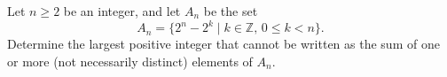 Let 
$n \ge 2$
 be an integer, and let 
$A_n$
 be the set 
\[A_n = \{2^n  - 2^k\mid k \in \mathbb{Z},\, 0 \le k < n\}.\]
 Determine the largest positive integer that cannot be written as the sum of one or more (not necessarily distinct) elements of 
$A_n$.


